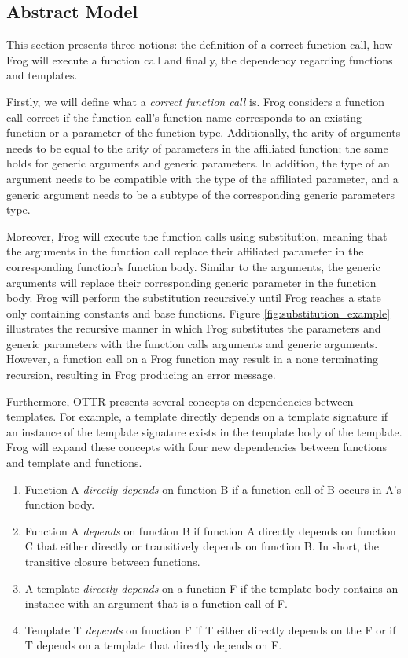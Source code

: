\subsection{Abstract Model}
This section presents three notions: the definition of a correct function call, how Frog will execute a function call and finally, the dependency regarding functions and templates. 

\para
Firstly, we will define what a \emph{correct function call} is. Frog considers a function call correct if the function call's function name corresponds to an existing function or a parameter of the function type. Additionally, the arity of arguments needs to be equal to the arity of parameters in the affiliated function; the same holds for generic arguments and generic parameters. In addition, the type of an argument needs to be compatible with the type of the affiliated parameter, and a generic argument needs to be a subtype of the corresponding generic parameters type.

\para
Moreover, Frog will execute the function calls using substitution, meaning that the arguments in the function call replace their affiliated parameter in the corresponding function's function body. Similar to the arguments, the generic arguments will replace their corresponding generic parameter in the function body. Frog will perform the substitution recursively until Frog reaches a state only containing constants and base functions. Figure \ref{fig:substitution_example} illustrates the recursive manner in which Frog substitutes the parameters and generic parameters with the function calls arguments and generic arguments. However, a function call on a Frog function may result in a none terminating recursion, resulting in Frog producing an error message.

\para 
Furthermore, OTTR presents several concepts on dependencies between templates. For example, a template directly depends on a template signature if an instance of the template signature exists in the template body of the template\autocite[484]{SLKF_OTTR_2018}. Frog will expand these concepts with four new dependencies between functions and template and functions.
\begin{enumerate}
    \item Function A \emph{directly depends} on function B if a function call of B occurs in A's function body. 
    \item Function A \emph{depends} on function B if function A directly depends on function C that either directly or transitively depends on function B. In short, the transitive closure between functions.
    \item A template \emph{directly depends} on a function F if the template body contains an instance with an argument that is a function call of F. 
    \item Template T \emph{depends} on function F if T either directly depends on the F or if T depends on a template that directly depends on F. 
\end{enumerate}

